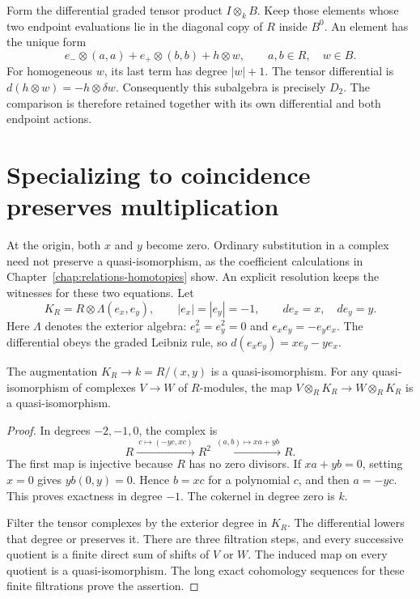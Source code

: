Form the differential graded tensor product $I\otimes_k B$.
Keep those elements whose two endpoint evaluations lie in
the diagonal copy of $R$ inside $B^0$.
An element has the unique form
\[
 e_-\otimes(a,a)+e_+\otimes(b,b)+h\otimes w,
 \qquad a,b\in R,\quad w\in B.
\]
For homogeneous $w$, its last term has degree $|w|+1$.
The tensor differential is
$d(h\otimes w)=-h\otimes\delta w$.
Consequently this subalgebra is precisely $D_2$.
The comparison is therefore retained together with its own
differential and both endpoint actions.

\section{Specializing to coincidence preserves multiplication}

At the origin, both $x$ and $y$ become zero.
Ordinary substitution in a complex need not preserve a
quasi-isomorphism, as the coefficient calculations in
Chapter~\ref{chap:relations-homotopies} show.
An explicit resolution keeps the witnesses for these two equations.
Let
\[
 K_R=R\otimes\Lambda(e_x,e_y),\qquad
 |e_x|=|e_y|=-1,\qquad de_x=x,\quad de_y=y.
\]
Here $\Lambda$ denotes the exterior algebra:
$e_x^2=e_y^2=0$ and $e_xe_y=-e_ye_x$.
The differential obeys the graded Leibniz rule, so
$d(e_xe_y)=xe_y-ye_x$.

\begin{lemma}\label{lem:ocr-residue-resolution}
The augmentation $K_R\to k=R/(x,y)$ is a quasi-isomorphism.
For any quasi-isomorphism of complexes $V\to W$ of $R$-modules,
the map $V\otimes_RK_R\to W\otimes_RK_R$ is a quasi-isomorphism.
\end{lemma}

\begin{proof}
In degrees $-2,-1,0$, the complex is
\[
 R\xrightarrow{\ c\mapsto(-yc,xc)\ }R^2
 \xrightarrow{\ (a,b)\mapsto xa+yb\ }R.
\]
The first map is injective because $R$ has no zero divisors.
If $xa+yb=0$, setting $x=0$ gives $yb(0,y)=0$.
Hence $b=xc$ for a polynomial $c$, and then $a=-yc$.
This proves exactness in degree $-1$.
The cokernel in degree zero is $k$.

Filter the tensor complexes by the exterior degree in $K_R$.
The differential lowers that degree or preserves it.
There are three filtration steps, and every successive quotient
is a finite direct sum of shifts of $V$ or $W$.
The induced map on every quotient is a quasi-isomorphism.
The long exact cohomology sequences for these finite filtrations
prove the assertion.
\end{proof}


